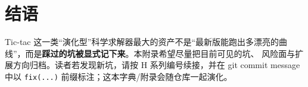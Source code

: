\section{结语}
\label{sec:appF_conclusion}

Tic-tac 这一类“演化型”科学求解器最大的资产不是“最新版能跑出多漂亮的曲线”，而是\textbf{踩过的坑被显式记下来}。本附录希望尽量把目前可见的坑、
风险面与扩展方向归档。读者若发现新坑，请按 H 系列编号续接，并在 git commit message 中以 \texttt{fix(...)} 前缀标注；这本字典/附录会随仓库一起演化。
